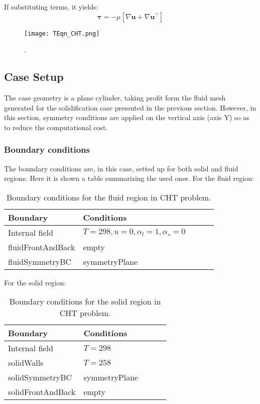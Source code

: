 If substituting terms, it yields:
\begin{equation}
	\boldsymbol{\tau}=-\mu\left[\nabla \mathbf{u}+\nabla \mathbf{u}^{\top}\right]
	\label{4.8}
\end{equation}
\begin{figure}[h!]
	\centering
	\texttt{[image: TEqn\_CHT.png]}	
	\label{4.4fig}
	\caption{.}
\end{figure} 
\subsection{Case Setup}
The case geometry is a plane cylinder, taking profit form the fluid mesh generated for the solidification case presented in the previous section. However, in this section, symmetry conditions are applied on the vertical axis (axis Y) so as to reduce the computational cost. 
\subsubsection{Boundary conditions}
The boundary conditions are, in this case, setted up for both solid and fluid regions. Here it is shown a table summarizing the used ones.
\newline
For the fluid region:
\begin{table}[h!]
	\begin{tabular}{@{}lllll@{}}
		\toprule[1pt]
		\textbf{Boundary} & \textbf{Conditions}  \\ \midrule[2pt]
		Internal field & $ T = 298, u = 0, \alpha_{l} = 1, \alpha_{s} = 0    $  \\
		fluidFrontAndBack & empty \\
		fluidSymmetryBC & symmetryPlane \\ \bottomrule[1pt]		
	\end{tabular}
	\centering
	\caption{Boundary conditions for the fluid region in CHT problem.}	
	\label{4.1tab}
\end{table}
For the solid region:
\begin{table}[h!]
	\begin{tabular}{@{}lllll@{}}
		\toprule[1pt]
		\textbf{Boundary} & \textbf{Conditions}  \\ \midrule[2pt]
		Internal field & $ T = 298$\\
		solidWalls & $T = 258$ \\
		solidSymmetryBC & symmetryPlane \\
		solidFrontAndBack & empty \\ \bottomrule[1pt]		
	\end{tabular}
	\centering
	\caption{Boundary conditions for the solid region in CHT problem.}	
	\label{4.2tab}
\end{table}

